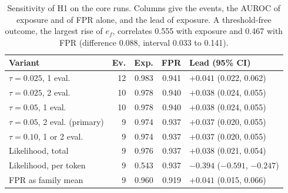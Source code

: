 \documentclass[11pt]{article}
\begin{document}
\makeatletter
\setlength{\@fptop}{0pt}
\setlength{\@fpbot}{0pt plus 1fil}
\makeatother
\begin{table}[h]
  \centering
  \footnotesize
  \setlength{\tabcolsep}{2pt}
  \begin{tabular}{@{}>{\raggedright\arraybackslash}p{1.85cm}rrrl@{}}
    \toprule
    Variant & Ev. & Exp. & FPR & Lead (95\% CI) \\
    \midrule
    $\tau = 0.025$, 1 eval. & 12 & 0.983 & 0.941 & $+0.041$ (0.022, 0.062) \\
    $\tau = 0.025$, 2 eval. & 10 & 0.978 & 0.940 & $+0.038$ (0.024, 0.055) \\
    $\tau = 0.05$, 1 eval. & 10 & 0.978 & 0.940 & $+0.038$ (0.024, 0.055) \\
    $\tau = 0.05$, 2 eval. (primary) & 9 & 0.974 & 0.937 & $+0.037$ (0.020, 0.055) \\
    $\tau = 0.10$, 1 or 2 eval. & 9 & 0.974 & 0.937 & $+0.037$ (0.020, 0.055) \\
    Likelihood, total & 9 & 0.976 & 0.937 & $+0.038$ (0.021, 0.054) \\
    Likelihood, per token & 9 & 0.543 & 0.937 & $-0.394$ ($-0.591$, $-0.247$) \\
    FPR as family mean & 9 & 0.960 & 0.919 & $+0.041$ (0.015, 0.066) \\
    \bottomrule
  \end{tabular}
  \caption{Sensitivity of H1 on the core runs. Columns give the events, the AUROC of exposure and of FPR alone, and
  the lead of exposure.
  A threshold-free outcome, the largest rise of $e_f$, correlates 0.555 with exposure and 0.467 with FPR (difference
  0.088, interval 0.033 to 0.141).}
  \label{tab:sensitivity}
\end{table}
\end{document}

